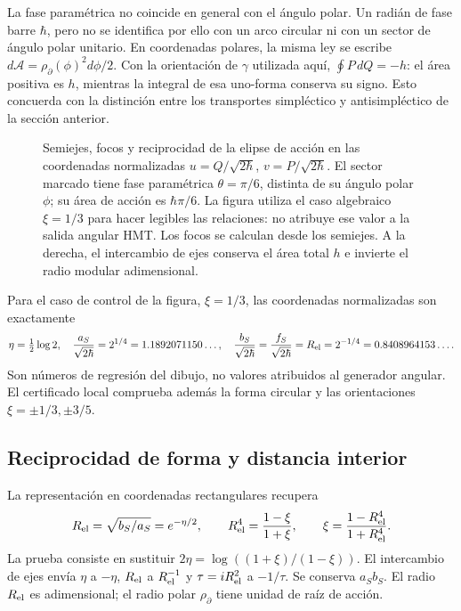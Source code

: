 La fase paramétrica no coincide en general con el ángulo polar. Un radián
de fase barre \(\hbar\), pero no se identifica por ello con un arco
circular ni con un sector de ángulo polar unitario. En coordenadas polares,
la misma ley se escribe
\(d\mathcal A=\rho_{\partial}(\phi)^2d\phi/2\).
Con la orientación de \(\gamma\) utilizada aquí,
\(\oint P\,dQ=-h\): el área positiva es \(h\), mientras la
integral de esa uno-forma conserva su signo. Esto concuerda con la
distinción entre los transportes simpléctico y antisimpléctico de la
sección anterior.

\begin{figure}[htbp]
 \centering
 
 \caption{Semiejes, focos y reciprocidad de la elipse de acción en las
 coordenadas normalizadas \(u=Q/\sqrt{2\hbar}\),
 \(v=P/\sqrt{2\hbar}\). El sector marcado tiene fase paramétrica
 \(\theta=\pi/6\), distinta de su ángulo polar \(\phi\); su área
 de acción es \(\hbar\pi/6\). La figura utiliza el caso algebraico
 \(\xi=1/3\) para hacer legibles las relaciones: no atribuye ese valor
 a la salida angular HMT. Los focos se calculan desde los semiejes.
 A la derecha, el intercambio de ejes conserva el área total \(h\)
 e invierte el radio modular adimensional.}
 \label{fig:ii-elipse-calculada}
\end{figure}

Para el caso de control de la figura, \(\xi=1/3\), las coordenadas
normalizadas son exactamente
\[
 \eta=\tfrac12\log2,\quad
 \frac{a_S}{\sqrt{2\hbar}}=2^{1/4}=1.1892071150\ldots,\quad
 \frac{b_S}{\sqrt{2\hbar}}=
 \frac{f_S}{\sqrt{2\hbar}}=R_{\rm el}=2^{-1/4}=0.8408964153\ldots.
\]
Son números de regresión del dibujo, no valores atribuidos al generador
angular. El certificado local comprueba además la forma circular y las
orientaciones \(\xi=\pm1/3,\pm3/5\).

\subsection{Reciprocidad de forma y distancia interior}

La representación en coordenadas rectangulares recupera
\begin{equation}
 R_{\rm el}=\sqrt{b_S/a_S}=e^{-\eta/2},\qquad
 R_{\rm el}^4=\frac{1-\xi}{1+\xi},\qquad
 \xi=\frac{1-R_{\rm el}^4}{1+R_{\rm el}^4}.
 \label{eq:ii-elipse-reciproca}
\end{equation}
La prueba consiste en sustituir
\(2\eta=\log((1+\xi)/(1-\xi))\). El intercambio de ejes
envía \(\eta\) a \(-\eta\), \(R_{\rm el}\) a
\(R_{\rm el}^{-1}\) y \(\tau=iR_{\rm el}^2\) a \(-1/\tau\).
Se conserva \(a_Sb_S\). El radio \(R_{\rm el}\) es adimensional;
el radio polar \(\rho_{\partial}\) tiene unidad de raíz de acción.

